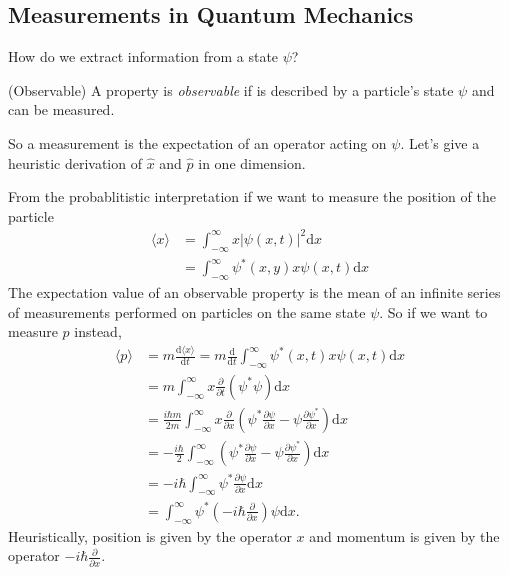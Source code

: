 \documentclass{article}
\begin{document}
\subsection{Measurements in Quantum Mechanics}
How do we extract information from a state $ \psi $?
\begin{definition}
	(Observable) A property is \textit{observable} if is described by a particle's state $ \psi $ and can be measured.
\end{definition}
So a measurement is the expectation of an operator acting on $ \psi $. Let's give a heuristic derivation of $ \hat x $ and $ \hat p $ in one dimension.\par
From the probablitistic interpretation if we want to measure the position of the particle
\begin{align*}
	\langle x\rangle &= \int_{-\infty}^\infty x|\psi(x,t)|^2\mathrm dx\\
			 &= \int_{-\infty}^\infty \psi^*(x,y)x\psi(x,t)\mathrm dx
\end{align*}
The expectation value of an observable property is the mean of an infinite series of measurements performed on particles on the same state $ \psi $. So if we want to measure $ p $ instead,
\begin{align*}
	\langle p\rangle &=m\frac{\mathrm d\langle x\rangle}{\mathrm dt}=m\frac{\mathrm d}{\mathrm dt}\int_{-\infty}^\infty \psi^*(x,t)x\psi(x,t)\mathrm dx\\
			 &=m\int_{-\infty}^\infty x\frac\partial{\partial t}(\psi^*\psi)\mathrm dx\\
			 &= \frac{i\hbar m}{2m}\int_{-\infty}^\infty x\frac{\partial}{\partial x}\left(\psi^*\frac{\partial \psi}{\partial x}-\psi\frac{\partial \psi^*}{\partial x}\right)\mathrm dx\\
			 &= -\frac{i\hbar}2\int_{-\infty}^\infty\left(\psi^*\frac{\partial \psi}{\partial x}-\psi\frac{\partial \psi^*}{\partial x}\right)\mathrm dx\\
			 &= -i\hbar \int_{-\infty}^\infty \psi^*\frac{\partial \psi}{\partial x}\mathrm dx\\
			 &= \int_{-\infty}^\infty \psi^*\left(-i\hbar\frac{\partial}{\partial x}\right)\psi\mathrm dx.
\end{align*}
Heuristically, position is given by the operator $ x $ and momentum is given by the operator $ -i\hbar\frac{\partial}{\partial x} $.
\end{document}
